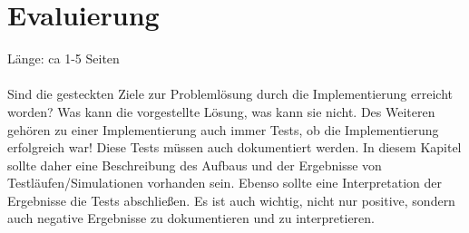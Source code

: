 \chapter{Evaluierung}
Länge: ca 1-5 Seiten\\\\
Sind die gesteckten Ziele zur Problemlösung durch die Implementierung erreicht worden? Was kann die vorgestellte Lösung, was kann sie nicht. Des Weiteren gehören zu einer Implementierung auch immer Tests, ob die Implementierung erfolgreich war! Diese Tests müssen auch dokumentiert werden. In diesem Kapitel sollte daher eine Beschreibung des Aufbaus und der Ergebnisse von Testläufen/Simulationen vorhanden sein. Ebenso sollte eine Interpretation der Ergebnisse die Tests abschließen. Es ist auch wichtig, nicht nur positive, sondern auch negative Ergebnisse zu dokumentieren und zu interpretieren.
